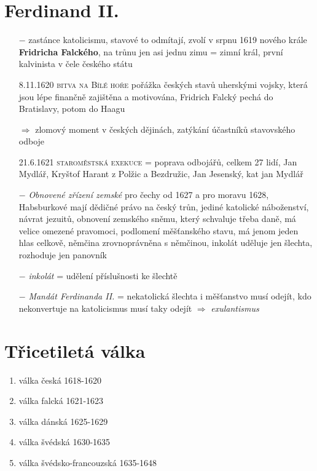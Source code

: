 \documentclass{article}
\begin{document}
\section*{Ferdinand II.}
\begin{itemize}
    \vspace{-0.5em}
    \setlength\itemsep{0.15em}
    \item[$-$] zastánce katolicismu, stavové to odmítají, zvolí v srpnu 1619 nového krále \textbf{Fridricha Falckého}, na trůnu jen asi jednu zimu = zimní král, první kalvinista v čele českého státu
    \item[8.11.1620] \textsc{bitva na Bílé hoře} pořážka českých stavů uherskými vojsky, která jsou lépe finančně zajištěna a motivována, Fridrich Falcký pechá do Bratislavy, potom do Haagu
    \item[$\Rightarrow$ ] zlomový moment v českých dějinách, zatýkání účastníků stavovského odboje
    \item[21.6.1621] \textsc{staroměstská exekuce} = poprava odbojářů, celkem 27 lidí, Jan Mydlář, Kryštof Harant z Polžic a Bezdružic,  Jan Jesenský, kat jan Mydlář
    \item[$-$] \textit{Obnovené zřízení zemské} pro čechy od 1627 a pro moravu 1628, Habsburkové mají dědičné právo na český trůn, jediné katolické náboženství, návrat jezuitů, obnovení zemského sněmu, který schvaluje třeba daně, má velice omezené pravomoci, podlomení měšťanského stavu, má jenom jeden hlas celkově, němčina zrovnoprávněna s němčinou, inkolát uděluje jen šlechta, rozhoduje jen panovník
    \item[$-$] \textit{inkolát} = udělení příslušnosti ke šlechtě
    \item[$-$] \textit{Mandát Ferdinanda II.} = nekatolická šlechta i měšťanstvo musí odejít, kdo nekonvertuje na katolicismus musí taky odejít $\Rightarrow$ \textit{exulantismus}

\end{itemize}



\section*{Třicetiletá válka}
\begin{enumerate}
    \vspace{-0.5em}
    \setlength\itemsep{0.15em}
    \item válka česká 1618-1620
    \item válka falcká 1621-1623
    \item válka dánská 1625-1629
    \item válka švédská 1630-1635
    \item válka švédsko-francouzská 1635-1648
\end{enumerate}
\end{document}
